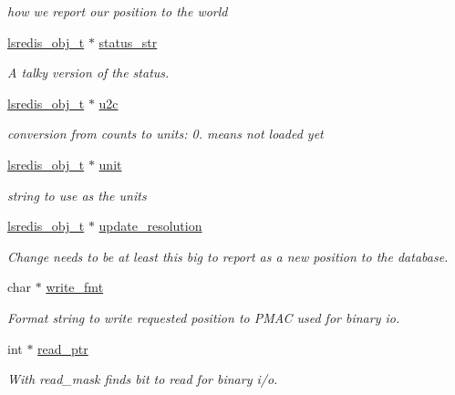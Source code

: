 \begin{DoxyCompactItemize}
\begin{DoxyCompactList}\small\item\em how we report our position to the world \end{DoxyCompactList}\item 
\hyperlink{pgpmac_8h_ad449de06d02791adf2498d2a1e1f909c}{lsredis\-\_\-obj\-\_\-t} $\ast$ \hyperlink{structlspmac__motor__struct_aa0a6bed8379c5b1f90a4eb826cde9136}{status\-\_\-str}
\begin{DoxyCompactList}\small\item\em A talky version of the status. \end{DoxyCompactList}\item 
\hyperlink{pgpmac_8h_ad449de06d02791adf2498d2a1e1f909c}{lsredis\-\_\-obj\-\_\-t} $\ast$ \hyperlink{structlspmac__motor__struct_a8838915ebb6f9989944117c8197d5e86}{u2c}
\begin{DoxyCompactList}\small\item\em conversion from counts to units\-: 0. means not loaded yet \end{DoxyCompactList}\item 
\hyperlink{pgpmac_8h_ad449de06d02791adf2498d2a1e1f909c}{lsredis\-\_\-obj\-\_\-t} $\ast$ \hyperlink{structlspmac__motor__struct_af8e6eb1df6b0d343fc4da93fbdd63133}{unit}
\begin{DoxyCompactList}\small\item\em string to use as the units \end{DoxyCompactList}\item 
\hyperlink{pgpmac_8h_ad449de06d02791adf2498d2a1e1f909c}{lsredis\-\_\-obj\-\_\-t} $\ast$ \hyperlink{structlspmac__motor__struct_aefa84c7592369090eec8b211caaa3a51}{update\-\_\-resolution}
\begin{DoxyCompactList}\small\item\em Change needs to be at least this big to report as a new position to the database. \end{DoxyCompactList}\item 
char $\ast$ \hyperlink{structlspmac__motor__struct_a70291ddfe7994c0bec7fc2287cb6dd89}{write\-\_\-fmt}
\begin{DoxyCompactList}\small\item\em Format string to write requested position to P\-M\-A\-C used for binary io. \end{DoxyCompactList}\item 
int $\ast$ \hyperlink{structlspmac__motor__struct_a844b28ccabab5048ca216db074fb9704}{read\-\_\-ptr}
\begin{DoxyCompactList}\small\item\em With read\-\_\-mask finds bit to read for binary i/o. \end{DoxyCompactList}\item 

\end{DoxyCompactItemize}
